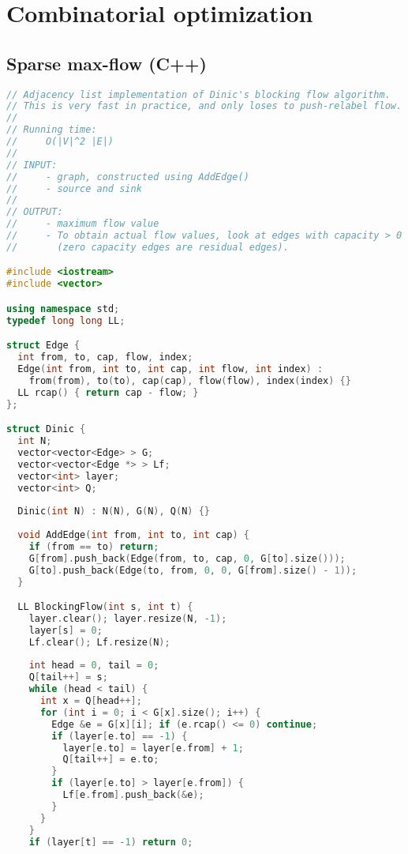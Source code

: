 \section{Combinatorial optimization}
\subsection{Sparse max-flow (C++)}
\begin{lstlisting}[language=C++]
// Adjacency list implementation of Dinic's blocking flow algorithm.
// This is very fast in practice, and only loses to push-relabel flow.
//
// Running time:
//     O(|V|^2 |E|)
//
// INPUT:
//     - graph, constructed using AddEdge()
//     - source and sink
//
// OUTPUT:
//     - maximum flow value
//     - To obtain actual flow values, look at edges with capacity > 0
//       (zero capacity edges are residual edges).

#include <iostream>
#include <vector>

using namespace std;
typedef long long LL;

struct Edge {
  int from, to, cap, flow, index;
  Edge(int from, int to, int cap, int flow, int index) :
    from(from), to(to), cap(cap), flow(flow), index(index) {}
  LL rcap() { return cap - flow; }
};

struct Dinic {
  int N;
  vector<vector<Edge> > G;
  vector<vector<Edge *> > Lf;
  vector<int> layer;
  vector<int> Q;
  
  Dinic(int N) : N(N), G(N), Q(N) {}
  
  void AddEdge(int from, int to, int cap) {
    if (from == to) return;
    G[from].push_back(Edge(from, to, cap, 0, G[to].size()));
    G[to].push_back(Edge(to, from, 0, 0, G[from].size() - 1));
  }

  LL BlockingFlow(int s, int t) {
    layer.clear(); layer.resize(N, -1);
    layer[s] = 0;
    Lf.clear(); Lf.resize(N);
    
    int head = 0, tail = 0;
    Q[tail++] = s;
    while (head < tail) {
      int x = Q[head++];
      for (int i = 0; i < G[x].size(); i++) {
        Edge &e = G[x][i]; if (e.rcap() <= 0) continue;
        if (layer[e.to] == -1) {
          layer[e.to] = layer[e.from] + 1;
          Q[tail++] = e.to;
        }
        if (layer[e.to] > layer[e.from]) {
          Lf[e.from].push_back(&e);
        }
      }
    }
    if (layer[t] == -1) return 0;


\end{lstlisting}
